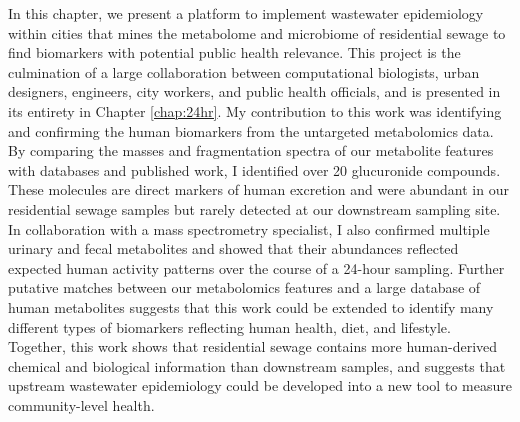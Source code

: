 In this chapter, we present a platform to implement wastewater epidemiology within cities that mines the metabolome and microbiome of residential sewage to find biomarkers with potential public health relevance.
This project is the culmination of a large collaboration between computational biologists, urban designers, engineers, city workers, and public health officials, and is presented in its entirety in Chapter \ref{chap:24hr}.
My contribution to this work was identifying and confirming the human biomarkers from the untargeted metabolomics data.
By comparing the masses and fragmentation spectra of our metabolite features with databases and published work, I identified over 20 glucuronide compounds.
These molecules are direct markers of human excretion and were abundant in our residential sewage samples but rarely detected at our downstream sampling site.
In collaboration with a mass spectrometry specialist, I also confirmed multiple urinary and fecal metabolites and showed that their abundances reflected expected human activity patterns over the course of a 24-hour sampling.
Further putative matches between our metabolomics features and a large database of human metabolites \cite{hmdb} suggests that this work could be extended to identify many different types of biomarkers reflecting human health, diet, and lifestyle.
Together, this work shows that residential sewage contains more human-derived chemical and biological information than downstream samples, and suggests that upstream wastewater epidemiology could be developed into a new tool to measure community-level health.

\begin{singlespace}


\end{singlespace}
